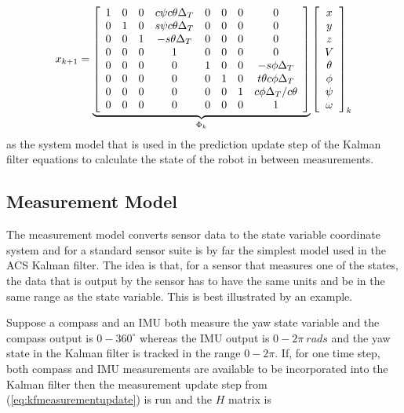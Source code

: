 \begin{align}
\label{eq:kfSystemModelWithAssumptions}
x_{k+1} = 
\underbrace{\left[\begin{array}{c c c c c c c c}
1 & 0 & 0 & c\psi c\theta \Delta_T & 0 & 0 & 0 & 0 \\
0 & 1 & 0 & s\psi c\theta \Delta_T & 0 & 0 & 0 & 0\\
0 & 0 & 1 & -s\theta \Delta_T & 0 & 0 & 0 & 0\\
0 & 0 & 0 & 1 & 0 & 0 & 0 & 0 \\
0 & 0 & 0 & 0 & 1 & 0 & 0 & -s\phi \Delta_T \\
0 & 0 & 0 & 0 & 0 & 1 & 0 & t\theta c\phi \Delta_T \\
0 & 0 & 0 & 0 & 0 & 0 & 1 & c\phi \Delta_T/c\theta \\
0 & 0 & 0 & 0 & 0 & 0 & 0 & 1
\end{array}\right]}_{\Phi_k}
\left[\begin{array}{c}
x \\ y \\ z \\ V \\ \theta \\ \phi \\ \psi \\ \omega
\end{array}\right]_k
\end{align}
as the system model that is used in the prediction update step of the Kalman filter equations to calculate the state of the robot in between measurements.

\subsection{Measurement Model}
\label{sec:kfMeasurementModel}
The measurement model converts sensor data to the state variable coordinate system and for a standard sensor suite is by far the simplest model used in the ACS Kalman filter. The idea is that, for a sensor that measures one of the states, the data that is output by the sensor has to have the same units and be in the same range as the state variable. This is best illustrated by an example.

Suppose a compass and an IMU both measure the yaw state variable and the compass output is $0 - 360^\circ$ whereas the IMU output is $0 - 2\pi~rads$ and the yaw state in the Kalman filter is tracked in the range $0 - 2\pi$. If, for one time step, both compass and IMU measurements are available to be incorporated into the Kalman filter then the measurement update step from (\ref{eq:kfmeasurementupdate}) is run and the $H$ matrix is

